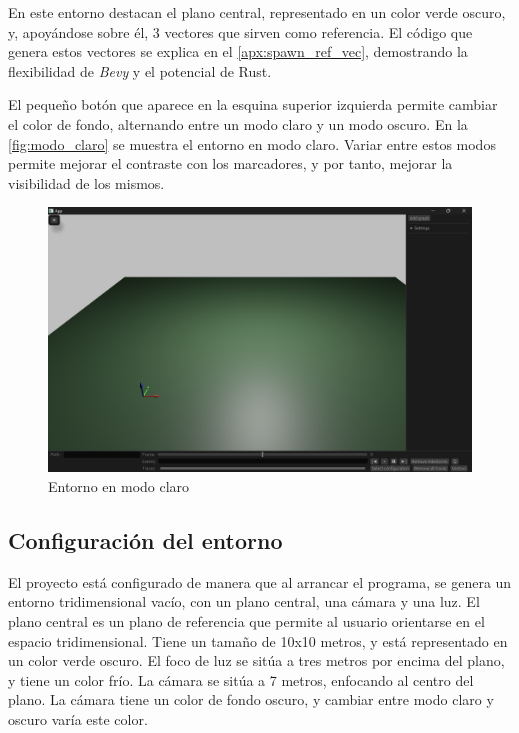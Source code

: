 En este entorno destacan el plano central, representado en un color verde oscuro, y, apoyándose sobre él, 3 vectores que sirven como referencia. El código que genera estos vectores se explica en el \autoref{apx:spawn_ref_vec}, demostrando la flexibilidad de \textit{Bevy} y el potencial de Rust. 

El pequeño botón que aparece en la esquina superior izquierda permite cambiar el color de fondo, alternando entre un modo claro y un modo oscuro. En la \autoref{fig:modo_claro} se muestra el entorno en modo claro. Variar entre estos modos permite mejorar el contraste con los marcadores, y por tanto, mejorar la visibilidad de los mismos.

\begin{figure}[H]
  \centering
  \includegraphics[width=\textwidth]{imagenes/modo_claro.png}
  \caption{Entorno en modo claro}
  \label{fig:modo_claro}
\end{figure}

\subsection{Configuración del entorno} \label{sec:bevy-configuracion}

El proyecto está configurado de manera que al arrancar el programa, se genera un entorno tridimensional vacío, con un plano central, una cámara y una luz. El plano central es un plano de referencia que permite al usuario orientarse en el espacio tridimensional. Tiene un tamaño de 10x10 metros, y está representado en un color verde oscuro. El foco de luz se sitúa a tres metros por encima del plano, y tiene un color frío. La cámara se sitúa a 7 metros, enfocando al centro del plano. La cámara tiene un color de fondo oscuro, y cambiar entre modo claro y oscuro varía este color.

